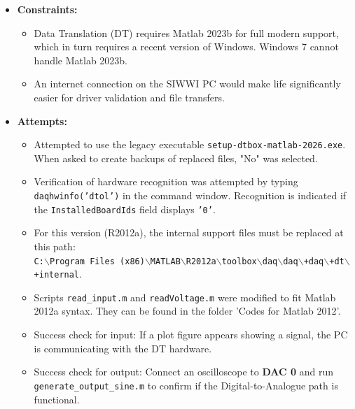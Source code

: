 \documentclass{article}
\begin{document}
    \begin{itemize}
        \item \textbf{Constraints:}
        \begin{itemize}
            \item Data Translation (DT) requires Matlab 2023b for full modern support, which in turn requires a recent version of Windows. Windows 7 cannot handle Matlab 2023b.
            \item An internet connection on the SIWWI PC would make life significantly easier for driver validation and file transfers.
        \end{itemize}

        \item \textbf{Attempts:}
        \begin{itemize}
            \item Attempted to use the legacy executable \texttt{setup-dtbox-matlab-2026.exe}. When asked to create backups of replaced files, "No" was selected.
            \item Verification of hardware recognition was attempted by typing \texttt{daqhwinfo('dtol')} in the command window. Recognition is indicated if the \texttt{InstalledBoardIds} field displays \texttt{'0'}.
            \item For this version (R2012a), the internal support files must be replaced at this path: \\ \texttt{C:$\backslash$Program Files (x86)$\backslash$MATLAB$\backslash$R2012a$\backslash$toolbox$\backslash$daq$\backslash$daq$\backslash$+daq$\backslash$+dt$\backslash$+internal}.
            \item Scripts \texttt{read\_input.m} and \texttt{readVoltage.m} were modified to fit Matlab 2012a syntax. They can be found in the folder 'Codes for Matlab 2012'.
            \item Success check for input: If a plot figure appears showing a signal, the PC is communicating with the DT hardware.
            \item Success check for output: Connect an oscilloscope to \textbf{DAC 0} and run \texttt{generate\_output\_sine.m} to confirm if the Digital-to-Analogue path is functional.
        \end{itemize}
    \end{itemize}
\end{document}
